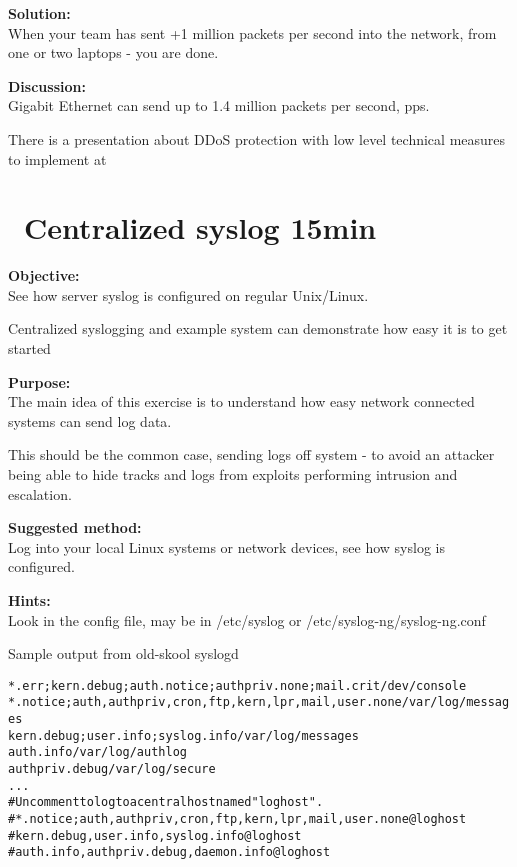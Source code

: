 \documentclass[a4paper,11pt,notitlepage]{report}
\begin{document}
{\bf Solution:}\\
When your team has sent +1 million packets per second into the network, from one or two laptops - you are done.

{\bf Discussion:}\\
Gigabit Ethernet can send up to 1.4 million packets per second, pps.

There is a presentation about DDoS protection with low level technical measures to implement at\\
{\footnotesize {}}


\chapter{\faExclamationTriangle\ Centralized syslog 15min}
\label{ex:centralized-syslog-practical}

{\bf Objective:} \\
See how server syslog is configured on regular Unix/Linux.

Centralized syslogging and example system can demonstrate how easy it is to get started

{\bf Purpose:}\\
The main idea of this exercise is to understand how easy network connected systems can send log data.

This should be the common case, sending logs off system - to avoid an attacker being able to hide tracks and logs from exploits performing intrusion and escalation.

{\bf Suggested method:}\\
Log into your local Linux systems or network devices, see how syslog is configured.

{\bf Hints:}\\
Look in the config file, may be in /etc/syslog  or /etc/syslog-ng/syslog-ng.conf

Sample output from old-skool syslogd
\begin{alltt}
\small
*.err;kern.debug;auth.notice;authpriv.none;mail.crit    /dev/console
*.notice;auth,authpriv,cron,ftp,kern,lpr,mail,user.none /var/log/messages
kern.debug;user.info;syslog.info                        /var/log/messages
auth.info                                               /var/log/authlog
authpriv.debug                                          /var/log/secure
...
# Uncomment to log to a central host named "loghost".
#*.notice;auth,authpriv,cron,ftp,kern,lpr,mail,user.none        @loghost
#kern.debug,user.info,syslog.info                               @loghost
#auth.info,authpriv.debug,daemon.info                           @loghost
\end{alltt}
\end{document}
